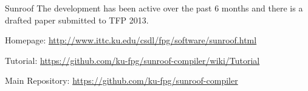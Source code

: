 \begin{hcarentry}[updated]{Sunroof}
The development has been active over the past 6 months and there is
a drafted paper submitted to TFP 2013.

\FurtherReading
\begin{compactitem}
\item Homepage: \url{http://www.ittc.ku.edu/csdl/fpg/software/sunroof.html}\\
\item Tutorial: \url{https://github.com/ku-fpg/sunroof-compiler/wiki/Tutorial}\\
\item Main Repository: \url{https://github.com/ku-fpg/sunroof-compiler}\\
\end{compactitem}
\end{hcarentry}
